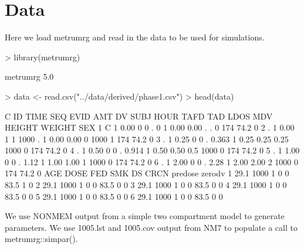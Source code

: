 \section{Data}
Here we load metrumrg and read in the data to be used
for simulations.
\begin{Schunk}
\begin{Sinput}
> library(metrumrg)
\end{Sinput}
\begin{Soutput}
metrumrg 5.0 
\end{Soutput}
\begin{Sinput}
> data <- read.csv("../data/derived/phase1.csv")
> head(data)
\end{Sinput}
\begin{Soutput}
  C ID TIME SEQ EVID  AMT    DV SUBJ HOUR TAFD  TAD LDOS MDV HEIGHT WEIGHT SEX
1 C  1 0.00   0    0    .     0    1 0.00 0.00    .    .   0    174   74.2   0
2 .  1 0.00   1    1 1000     .    1 0.00 0.00    0 1000   1    174   74.2   0
3 .  1 0.25   0    0    . 0.363    1 0.25 0.25 0.25 1000   0    174   74.2   0
4 .  1 0.50   0    0    . 0.914    1 0.50 0.50  0.5 1000   0    174   74.2   0
5 .  1 1.00   0    0    .  1.12    1 1.00 1.00    1 1000   0    174   74.2   0
6 .  1 2.00   0    0    .  2.28    1 2.00 2.00    2 1000   0    174   74.2   0
   AGE DOSE FED SMK DS CRCN predose zerodv
1 29.1 1000   1   0  0 83.5       1      0
2 29.1 1000   1   0  0 83.5       0      0
3 29.1 1000   1   0  0 83.5       0      0
4 29.1 1000   1   0  0 83.5       0      0
5 29.1 1000   1   0  0 83.5       0      0
6 29.1 1000   1   0  0 83.5       0      0
\end{Soutput}
\end{Schunk}
We use NONMEM output from a simple two compartment model to generate parameters.
We use 1005.lst and 1005.cov output from NM7 to populate a call to metrumrg::simpar().
